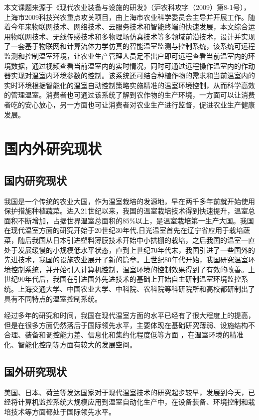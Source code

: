 本文课题来源于《现代农业装备与设施的研发》（沪农科攻字（2009）第8-1号），上海市2009科技兴农重点攻关项目，由上海市农业科学委员会主导并开展工作。随着今年来物联网技术、网络技术、云服务技术和智能终端的快速发展，本文综合运用物联网技术、无线传感技术和多物理场仿真技术等多领域前沿技术，设计并实现了一套基于物联网和计算流体力学仿真的智能温室监测与控制系统，该系统可远程监测和控制温室环境，让农业生产管理人员足不出户即可远程查看当前温室内的环境数据，通过视频查看当前温室内的实时情况，同时可通过远程操作温室内的作动器实现对温室内环境参数的控制。该系统还可结合种植作物的需求和当前温室内的实时环境根据智能化的温室自动控制策略实施精准的温室环境控制，从而科学高效的管理温室。消费者也可通过该系统了解到农作物的生产环境，一方面可以让消费者吃的安心放心，另一方面也可让消费者对农业生产进行监督，促进农业生产健康发展。
\section{国内外研究现状}
	\subsection{国内研究现状}
	我国是一个传统的农业大国，作为温室栽培的发源地，早在两千多年前就开始使用保护措施种植蔬菜。进入21世纪以来，我国的温室栽培技术得到快速提升，温室总面积不断增加，占据世界温室总面积的85\%以上，是温室栽培第一生产大国\supercite{WoGuoSheShiNongYe}。我国在现代温室方面的研究开始于20世纪30年代,日光温室首先在辽宁省应用于栽培蔬菜，随后我国从日本引进塑料薄膜技术开始中小拱棚的栽培，之后我国的温室一直处于发展缓慢的小规模低水平状态，直到上世纪70年代末，我国引进了一些国外的先进技术，我国的设施农业展开了新的篇章\supercite{xiandaiwenshi}。上世纪80年代开始，我国研究温室环境控制系统，并开始引入计算机控制，温室环境的控制效果得到了有效的改善\supercite{HanYi2016}。上世纪90年代后，我国在引进国外先进技术的基础上开始自主研制温室环境监控系统。上海交通大学、中国农业大学、中科院、农科院等科研院所和高校都研制出了具有不同特点的温室控制系统。
	
	经过多年的研究和时间，我国在现代温室方面的水平已经有了很大程度上的提高，但是在很多方面仍然落后于国际领先水平，主要体现在基础研究薄弱、设施结构不合理、装备和调控能力差、信息化和集约化程度低等方面\supercite{ZhangZhen2015,JiangWeijie2015} ，在温室环境的精准化、智能化控制等方面有较大的发展空间。
	\subsection{国外研究现状}
	美国、日本、荷兰等发达国家对于现代温室技术的研究起步较早，发展到今天，已经将计算机监控系统大规模应用到温室自动化生产中，在设备装备、环境控制和栽培技术等方面都处于国际领先水平。
	
